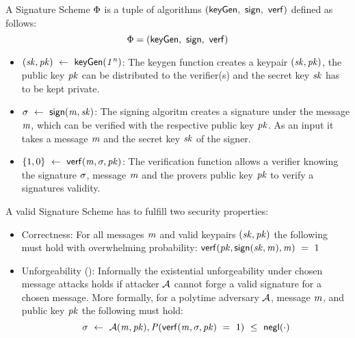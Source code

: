 \begin{definition}\label{def:pre:signature-scheme}
    A Signature Scheme $\Phi$ is a tuple of algorithms $(\mathsf{keyGen} ,~ \mathsf{sign} ,~ \mathsf{verf})$ defined as follows:~\cite{goldwasser1988digital}
    \[ \Phi = (\mathsf{keyGen} ,~ \mathsf{sign} ,~ \mathsf{verf}) \]

    \begin{itemize}
        \item $(\mathit{sk}, \mathit{pk}) ~\leftarrow~ \mathsf{keyGen}(\mathit{1^n})$: The keygen function creates a keypair $(\mathit{sk}, \mathit{pk})$, the public key $\mathit{pk}$ can be distributed to the verifier(s) and the secret key $\mathit{sk}$ has to be kept private. \\
        \item $\sigma ~\leftarrow~ \mathsf{sign}(\mathit{m}, \mathit{sk})$: The signing algoritm creates a signature under the message $\mathit{m}$, which can be verified with the respective public key $\mathit{pk}$.
        As an input it takes a message $\mathit{m}$ and the secret key $\mathit{sk}$ of the signer.
        \item $\{1,0\} ~\leftarrow~ \mathsf{verf}(\mathit{m}, \sigma, \mathit{pk})$: The verification function allows a verifier knowing the signature $\sigma$, message $\mathit{m}$ and the provers public key $\mathit{pk}$ to verify a signatures
        validity. \\
    \end{itemize}

    A valid Signature Scheme has to fulfill two security properties:
    \begin{itemize}
        \item Correctness: For all messages $\mathit{m}$ and valid keypairs $(\mathit{sk}, \mathit{pk})$ the following must hold with overwhelming probability: $\mathsf{verf}(\mathit{pk}, \mathsf{sign}(\mathit{sk}, \mathit{m}), \mathit{m}) ~=~ 1$
        \item Unforgeability (\cnstEUFCMA): Informally the existential unforgeability under chosen message attacks holds if attacker $\mathcal{A}$ cannot forge a valid signature for a chosen message.
        More formally, for a polytime adversary $\mathcal{A}$, message $\mathit{m}$, and public key $\mathit{pk}$ the following must hold:
        \[ \sigma ~\leftarrow~ \mathcal{A}(\mathit{m}, \mathit{pk}), \mathit{P}(\mathsf{verf}(\mathit{m}, \sigma, \mathit{pk}) ~=~ 1) ~\leq~ \mathsf{negl}(\cdot) \]
    \end{itemize}
\end{definition}

